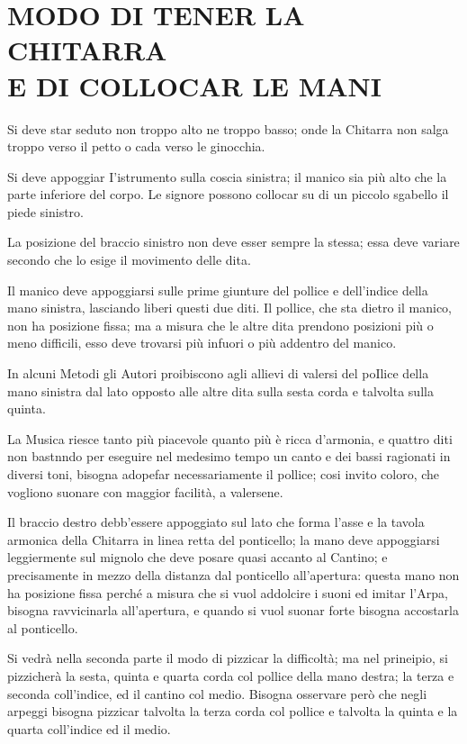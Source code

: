 \documentclass[a4paper]{book}
\begin{document}
\chapter[Il modo di tener la Chitarra e di collocar le mani]{%
  MODO DI TENER LA CHITARRA\\
  \small E DI COLLOCAR LE MANI}

Si deve star seduto non troppo alto ne troppo basso; onde la Chitarra non salga troppo verso il petto o cada verso le ginocchia.

Si deve appoggiar I'istrumento sulla coscia sinistra; il manico sia più alto che la parte inferiore del corpo.  Le signore possono collocar su di un piccolo sgabello il piede sinistro.

La posizione del braccio sinistro non deve esser sempre la stessa; essa deve variare secondo che lo esige il movimento delle dita.

Il manico deve appoggiarsi sulle prime giunture del pollice e dell'indice della mano sinistra, lasciando liberi questi due diti.  Il pollice, che sta dietro il manico, non ha posizione fissa; ma a misura che le altre dita prendono posizioni più o meno difficili, esso deve trovarsi più infuori o più addentro del manico.

In alcuni Metodi gli Autori proibiscono agli allievi di valersi del poIlice della mano sinistra dal lato opposto alle altre dita sulla sesta corda e talvolta sulla quinta.
\clearpage

La Musica riesce tanto più piacevole quanto più è ricca d'armonia, e quattro diti non bastnndo per eseguire nel medesimo tempo un canto e dei bassi ragionati in diversi toni, bisogna adopefar necessariamente il pollice; cosi invito coloro, che vogliono suonare con maggior facilità, a valersene.

Il braccio destro debb'essere appoggiato sul lato che forma l'asse e la tavola armonica della Chitarra in linea retta del ponticello; la mano deve appoggiarsi leggiermente sul mignolo che deve posare quasi accanto al Cantino; e precisamente in mezzo della distanza dal ponticello all'apertura: questa mano non ha posizione fissa perché a misura che si vuol addolcire i suoni ed imitar l'Arpa, bisogna ravvicinarla all'apertura, e quando si vuol suonar forte bisogna accostarla al ponticello.

Si vedrà nella seconda parte il modo di pizzicar la difficoltà; ma nel prineipio, si pizzicherà la sesta, quinta e quarta corda col pollice della mano destra; la terza e seconda coll'indice, ed il cantino col medio.  Bisogna osservare però che negli arpeggi bisogna pizzicar talvolta la terza corda col pollice e talvolta la quinta e la quarta coll'indice ed il medio.
\end{document}
